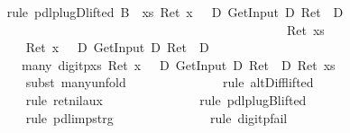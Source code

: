\begin{isabellebody}
\ \ \ \ \ \ \ \ \ \ \isamarkupfalse%
\ {\isacharparenleft}rule\ pdl{\isacharunderscore}plugD{\isacharunderscore}lifted{}{\isacharbrackleft}\ B\ {\isacharequal}\ {\isachardoublequote}{\isasymlambda}xs{\isachardot}\ Ret\ {\isacharparenleft}x\ {\isacharequal}\ {}{\isacharparenright}\ {\isasymand}\isactrlsub D\ GetInput\ {\isacharequal}\isactrlsub D\ Ret\ {\isacharbrackleft}{\isacharbrackright}\ {\isasymand}\isactrlsub D\isanewline
\ \ \ \ \ \ \ \ \ \ \ \ \ \ \ \ \ \ \ \ \ \ \ \ \ \ \ \ \ \ \ \ \ \ \ \ \ \ \ \ \ \ \ \ \ \ \ \ \ \ \ \ \ \ \ \ Ret\ {\isacharparenleft}xs\ {\isacharequal}\ {\isacharbrackleft}{\isacharbrackright}{\isacharparenright}{\isachardoublequote}{\isacharbrackright}{\isacharparenright}\isanewline
\ \ \ \ \ \ \ \ \ \ \ \ \isamarkupfalse%
\ {\isachardoublequote}{\isasymturnstile}\ Ret\ {\isacharparenleft}x\ {\isacharequal}\ {}{\isacharparenright}\ {\isasymand}\isactrlsub D\ GetInput\ {\isacharequal}\isactrlsub D\ Ret\ {\isacharbrackleft}{\isacharbrackright}\ {\isasymlongrightarrow}\isactrlsub D\isanewline
\ \ \ \ \ \ \ \ \ \ \ \ \ \ {\isasymlangle}many\ digitp{\isasymrangle}{\isacharparenleft}{\isasymlambda}xs{\isachardot}\ Ret\ {\isacharparenleft}x\ {\isacharequal}\ {}{\isacharparenright}\ {\isasymand}\isactrlsub D\ GetInput\ {\isacharequal}\isactrlsub D\ Ret\ {\isacharbrackleft}{\isacharbrackright}\ {\isasymand}\isactrlsub D\ Ret\ {\isacharparenleft}xs\ {\isacharequal}\ {\isacharbrackleft}{\isacharbrackright}{\isacharparenright}{\isacharparenright}{\isachardoublequote}\isanewline
\ \ \ \ \ \ \ \ \ \ \ \ \ \ \isamarkupfalse%
subst\ many{\isacharunderscore}unfold{\isacharparenright}\isanewline
\ \ \ \ \ \ \ \ \ \ \ \ \ \ \isamarkupfalse%
rule\ altD{\isacharunderscore}iff{\isacharunderscore}lifted{}{\isacharparenright}\isanewline
\ \ \ \ \ \ \ \ \ \ \ \ \ \ \isamarkupfalse%
rule\ ret{\isacharunderscore}nil{\isacharunderscore}aux{\isacharparenright}\isanewline
\ \ \ \ \ \ \ \ \ \ \ \ \ \ \isamarkupfalse%
rule\ pdl{\isacharunderscore}plugB{\isacharunderscore}lifted{}{\isacharparenright}\isanewline
\ \ \ \ \ \ \ \ \ \ \ \ \ \ \isamarkupfalse%
rule\ pdl{\isacharunderscore}imp{\isacharunderscore}strg{}{\isacharparenright}\isanewline
\ \ \ \ \ \ \ \ \ \ \ \ \ \ \isamarkupfalse%
rule\ digitp{\isacharunderscore}fail{\isacharparenright}\isanewline

\end{isabellebody}
